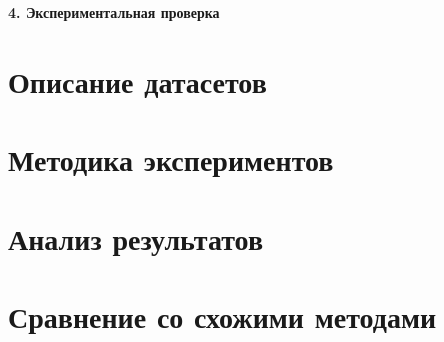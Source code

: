 \newpage
\begin{center}
  \textbf{\large 4. Экспериментальная проверка}
\end{center}

\section{Описание датасетов}
\section{Методика экспериментов}
\section{Анализ результатов}
\section{Сравнение со схожими методами}